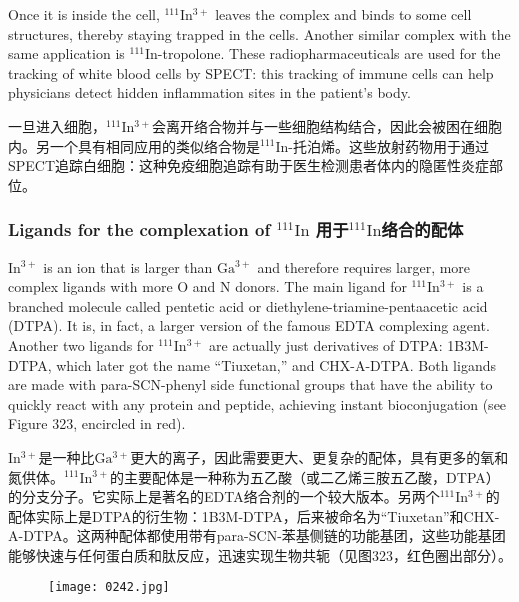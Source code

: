 \documentclass[dvipsnames, svgnames,a4paper,11pt]{article}
\begin{document}
Once it is inside the cell, \(\mathrm{^{111}In^{3+}}\) leaves the complex and binds to some cell structures, thereby staying trapped in the cells. Another similar complex with the same application is \(\mathrm{^{111}In}\)-tropolone. These radiopharmaceuticals are used for the tracking of white blood cells by SPECT: this tracking of immune cells can help physicians detect hidden inflammation sites in the patient's body.

一旦进入细胞，\(\mathrm{^{111}In^{3+}}\)会离开络合物并与一些细胞结构结合，因此会被困在细胞内。另一个具有相同应用的类似络合物是\(\mathrm{^{111}In}\)-托泊烯。这些放射药物用于通过SPECT追踪白细胞：这种免疫细胞追踪有助于医生检测患者体内的隐匿性炎症部位。

\subsubsection{Ligands for the complexation of \(\mathrm{^{111}In}\) 用于\(\mathrm{^{111}In}\)络合的配体}  

\(\mathrm{In^{3+}}\) is an ion that is larger than \(\mathrm{Ga^{3+}}\) and therefore requires larger, more complex ligands with more O and N donors. The main ligand for \(\mathrm{^{111}In^{3+}}\) is a branched molecule called pentetic acid or diethylene-triamine-pentaacetic acid (DTPA). It is, in fact, a larger version of the famous EDTA complexing agent. Another two ligands for \(\mathrm{^{111}In^{3+}}\) are actually just derivatives of DTPA: 1B3M-DTPA, which later got the name “Tiuxetan,” and CHX-A-DTPA. Both ligands are made with para-SCN-phenyl side functional groups that have the ability to quickly react with any protein and peptide, achieving instant bioconjugation (see Figure 323, encircled in red).

\(\mathrm{In^{3+}}\)是一种比\(\mathrm{Ga^{3+}}\)更大的离子，因此需要更大、更复杂的配体，具有更多的氧和氮供体。\(\mathrm{^{111}In^{3+}}\)的主要配体是一种称为五乙酸（或二乙烯三胺五乙酸，DTPA）的分支分子。它实际上是著名的EDTA络合剂的一个较大版本。另两个\(\mathrm{^{111}In^{3+}}\)的配体实际上是DTPA的衍生物：1B3M-DTPA，后来被命名为“Tiuxetan”和CHX-A-DTPA。这两种配体都使用带有para-SCN-苯基侧链的功能基团，这些功能基团能够快速与任何蛋白质和肽反应，迅速实现生物共轭（见图323，红色圈出部分）。

\begin{figure}[h]
	\centering
    \texttt{[image: 0242.jpg]}  
     \label{fig323}
\end{figure}
\end{document}
